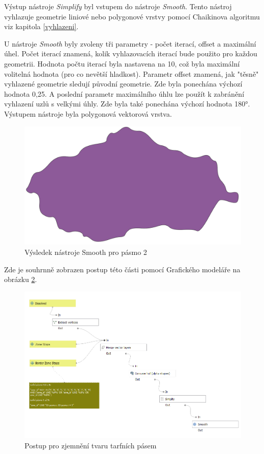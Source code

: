 Výstup nástroje \textit{Simplify} byl vstupem do nástroje \textit{Smooth}. Tento nástroj vyhlazuje geometrie
liniové nebo polygonové vrstvy pomocí Chaikinova algoritmu viz kapitola \ref{vyhlazeni}.

U nástroje \textit{Smooth} byly zvoleny tři parametry - počet iterací, offset a maximální úhel.
Počet iterací znamená, kolik vyhlazovacích iterací bude použito pro každou geometrii.
Hodnota počtu iterací byla nastavena na 10, což byla maximální volitelná hodnota (pro co nevětší hladkost).
Parametr offset znamená, jak "těsně" vyhlazené geometrie sledují původní geometrie.
Zde byla ponechána výchozí hodnota 0,25. A poslední parametr maximálního úhlu lze použít
k zabránění vyhlazení uzlů s velkými úhly. Zde byla také ponechána výchozí hodnota 180°.
Výstupem nástroje byla polygonová vektorová vrstva.

\begin{figure}[H] \centering
    \includegraphics[width=400pt]{./pictures/smooth.png}
    \caption[Výsledek nástroje Smooth pro pásmo 2]{Výsledek nástroje Smooth pro pásmo 2}
	\label{fig:smooth}                                
\end{figure}

Zde je souhrnně zobrazen postup této části pomocí Grafického modeláře na obrázku \ref{fig:postup-smooth}.

\begin{figure}[H] \centering
    \includegraphics[width=400pt]{./pictures/postup-smooth.png}
    \caption[Postup pro zjemnění tvaru tarfních pásem]{Postup pro zjemnění tvaru tarfních pásem}
	\label{fig:postup-smooth}              
\end{figure}

